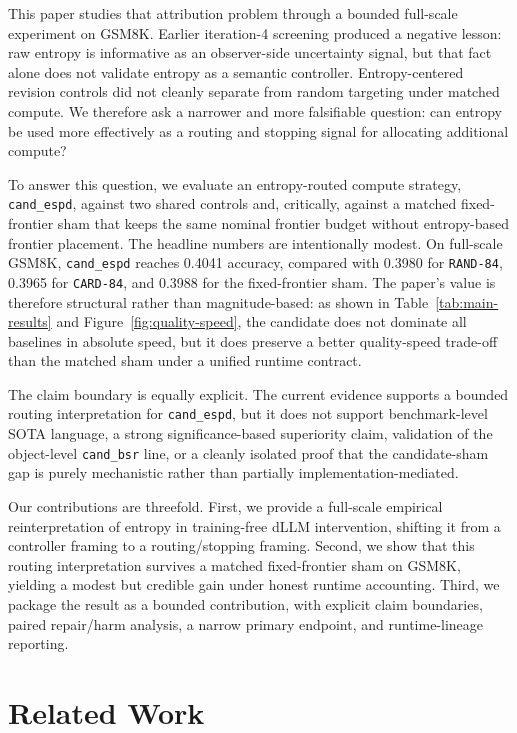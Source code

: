 \documentclass{article}
\begin{document}
This paper studies that attribution problem through a bounded full-scale experiment on GSM8K. Earlier iteration-4 screening produced a negative lesson: raw entropy is informative as an observer-side uncertainty signal, but that fact alone does not validate entropy as a semantic controller. Entropy-centered revision controls did not cleanly separate from random targeting under matched compute. We therefore ask a narrower and more falsifiable question: can entropy be used more effectively as a routing and stopping signal for allocating additional compute?

To answer this question, we evaluate an entropy-routed compute strategy, \texttt{cand\_espd}, against two shared controls and, critically, against a matched fixed-frontier sham that keeps the same nominal frontier budget without entropy-based frontier placement. The headline numbers are intentionally modest. On full-scale GSM8K, \texttt{cand\_espd} reaches 0.4041 accuracy, compared with 0.3980 for \texttt{RAND-84}, 0.3965 for \texttt{CARD-84}, and 0.3988 for the fixed-frontier sham. The paper's value is therefore structural rather than magnitude-based: as shown in Table~\ref{tab:main-results} and Figure~\ref{fig:quality-speed}, the candidate does not dominate all baselines in absolute speed, but it does preserve a better quality-speed trade-off than the matched sham under a unified runtime contract.

The claim boundary is equally explicit. The current evidence supports a bounded routing interpretation for \texttt{cand\_espd}, but it does not support benchmark-level SOTA language, a strong significance-based superiority claim, validation of the object-level \texttt{cand\_bsr} line, or a cleanly isolated proof that the candidate-sham gap is purely mechanistic rather than partially implementation-mediated.

Our contributions are threefold. First, we provide a full-scale empirical reinterpretation of entropy in training-free dLLM intervention, shifting it from a controller framing to a routing/stopping framing. Second, we show that this routing interpretation survives a matched fixed-frontier sham on GSM8K, yielding a modest but credible gain under honest runtime accounting. Third, we package the result as a bounded contribution, with explicit claim boundaries, paired repair/harm analysis, a narrow primary endpoint, and runtime-lineage reporting.

\section{Related Work}
\end{document}
